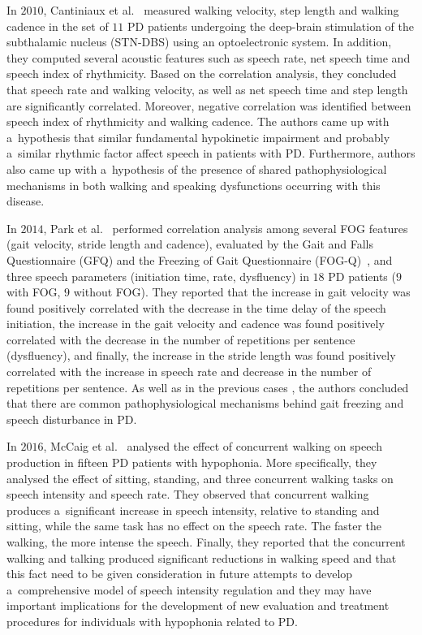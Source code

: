 In $2010$, Cantiniaux et al.~\cite{Cantiniaux2010} measured walking velocity, step length and walking cadence in the set of $11$ PD patients undergoing the deep-brain stimulation of the subthalamic nucleus (STN-DBS) using an optoelectronic system. In addition, they computed several acoustic features such as speech rate, net speech time and speech index of rhythmicity. Based on the correlation analysis, they concluded that speech rate and walking velocity, as well as net speech time and step length are significantly correlated. Moreover, negative correlation was identified between speech index of rhythmicity and walking cadence. The authors came up with a~hypothesis that similar fundamental hypokinetic impairment and probably a~similar rhythmic factor affect speech in patients with PD. Furthermore, authors also came up with a~hypothesis of the presence of shared pathophysiological mechanisms in both walking and speaking dysfunctions occurring with this disease.

In $2014$, Park et al.~\cite{Park2014} performed correlation analysis among several FOG features (gait velocity, stride length and cadence), evaluated by the Gait and Falls Questionnaire (GFQ) and the Freezing of Gait Questionnaire (FOG-Q)~\cite{Giladi2000}, and three speech parameters (initiation time, rate, dysfluency) in $18$ PD patients ($9$ with FOG, $9$ without FOG). They reported that the increase in gait velocity was found positively correlated with the decrease in the time delay of the speech initiation, the increase in the gait velocity and cadence was found positively correlated with the decrease in the number of repetitions per sentence (dysfluency), and finally, the increase in the stride length was found positively correlated with the increase in speech rate and decrease in the number of repetitions per sentence. As well as in the previous cases \cite{Giladi2001b, Bartels2003, Goberman2005b, Cantiniaux2010}, the authors concluded that there are common pathophysiological mechanisms behind gait freezing and speech disturbance in PD.

In $2016$, McCaig et al.~\cite{McCaig2016} analysed the effect of concurrent walking on speech production in fifteen PD patients with hypophonia. More specifically, they analysed the effect of sitting, standing, and three concurrent walking tasks on speech intensity and speech rate. They observed that concurrent walking produces a~significant increase in speech intensity, relative to standing and sitting, while the same task has no effect on the speech rate. The faster the walking, the more intense the speech. Finally, they reported that the concurrent walking and talking produced significant reductions in walking speed and that this fact need to be given consideration in future attempts to develop a~comprehensive model of speech intensity regulation and they may have important implications for the development of new evaluation and treatment procedures for individuals with hypophonia related to PD.

